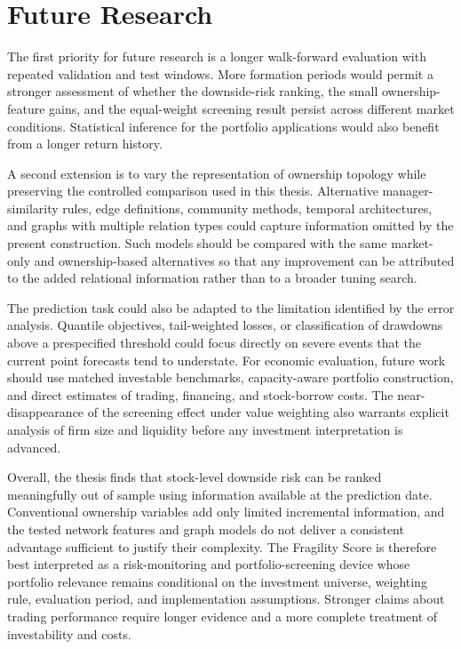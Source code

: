 \section{Future Research}
\label{sec:future_research}

The first priority for future research is a longer walk-forward evaluation with repeated validation and test windows. More formation periods would permit a stronger assessment of whether the downside-risk ranking, the small ownership-feature gains, and the equal-weight screening result persist across different market conditions. Statistical inference for the portfolio applications would also benefit from a longer return history.

A second extension is to vary the representation of ownership topology while preserving the controlled comparison used in this thesis. Alternative manager-similarity rules, edge definitions, community methods, temporal architectures, and graphs with multiple relation types could capture information omitted by the present construction. Such models should be compared with the same market-only and ownership-based alternatives so that any improvement can be attributed to the added relational information rather than to a broader tuning search.

The prediction task could also be adapted to the limitation identified by the error analysis. Quantile objectives, tail-weighted losses, or classification of drawdowns above a prespecified threshold could focus directly on severe events that the current point forecasts tend to understate. For economic evaluation, future work should use matched investable benchmarks, capacity-aware portfolio construction, and direct estimates of trading, financing, and stock-borrow costs. The near-disappearance of the screening effect under value weighting also warrants explicit analysis of firm size and liquidity before any investment interpretation is advanced.

Overall, the thesis finds that stock-level downside risk can be ranked meaningfully out of sample using information available at the prediction date. Conventional ownership variables add only limited incremental information, and the tested network features and graph models do not deliver a consistent advantage sufficient to justify their complexity. The Fragility Score is therefore best interpreted as a risk-monitoring and portfolio-screening device whose portfolio relevance remains conditional on the investment universe, weighting rule, evaluation period, and implementation assumptions. Stronger claims about trading performance require longer evidence and a more complete treatment of investability and costs.
